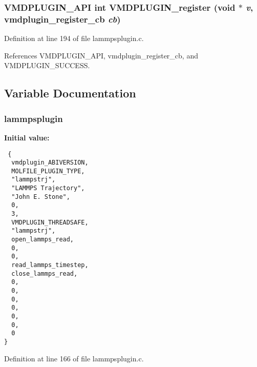 \subsubsection{\setlength{\rightskip}{0pt plus 5cm}VMDPLUGIN\_\-API int VMDPLUGIN\_\-register (void $\ast$ {\em v}, {\bf vmdplugin\_\-register\_\-cb} {\em cb})}\label{lammpsplugin_8c_a6}




Definition at line 194 of file lammpsplugin.c.

References VMDPLUGIN\_\-API, vmdplugin\_\-register\_\-cb, and VMDPLUGIN\_\-SUCCESS.

\subsection{Variable Documentation}
\subsubsection{ lammpsplugin\hspace{0.3cm}{\tt  [static]}}\label{lammpsplugin_8c_a1}


{\bf Initial value:}

\footnotesize\begin{verbatim} {
  vmdplugin_ABIVERSION,
  MOLFILE_PLUGIN_TYPE,                         
  "lammpstrj",                                 
  "LAMMPS Trajectory",                         
  "John E. Stone",                             
  0,                                           
  3,                                           
  VMDPLUGIN_THREADSAFE,                        
  "lammpstrj",
  open_lammps_read,
  0,
  0,
  read_lammps_timestep,
  close_lammps_read,
  0,                            
  0,
  0,
  0,
  0,                            
  0,                            
  0                             
}\end{verbatim}\normalsize 


Definition at line 166 of file lammpsplugin.c.